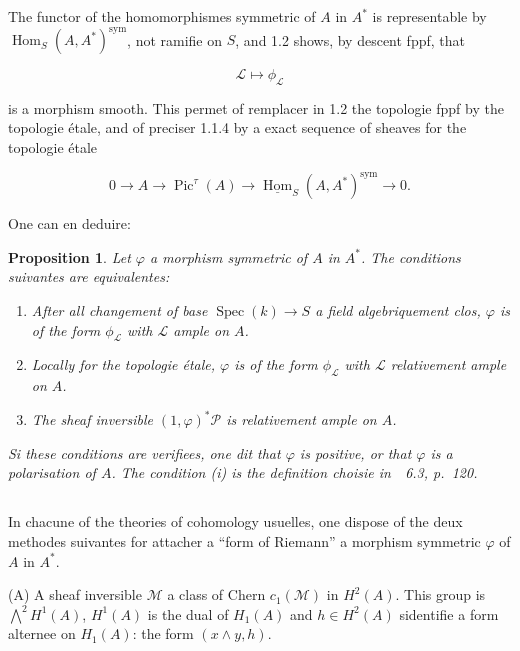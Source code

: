 \documentclass[11pt,a4paper]{article}
\theoremstyle{plain}
\newtheorem{proposition}[theorem]{Proposition}
\theoremstyle{definition}
\DeclareMathOperator{\Hom}{Hom}
\DeclareMathOperator{\Spec}{Spec}
\DeclareMathOperator{\Pic}{Pic}
\begin{document}
The functor of the homomorphismes symmetric of $A$ in $A^*$ is representable by $\Hom_S(A, A^*)^{\text{sym}}$, not ramifie on $S$, and 1.2 shows, by descent fppf,
that

\begin{equation}
\mathscr{L} \longmapsto \phi_{\mathscr{L}}
\end{equation}

is a morphism smooth. This permet of remplacer in 1.2 the topologie fppf
by the topologie étale, and of preciser 1.1.4 by a exact sequence of sheaves for
the topologie étale

\begin{equation}
0 \longrightarrow A \longrightarrow \Pic^\tau(A) \longrightarrow \underline{\Hom}_S(A, A^*)^{\text{sym}} \longrightarrow 0.
\end{equation}

One can en deduire:

\begin{proposition}
Let $\varphi$ a morphism symmetric of $A$ in $A^*$. The
conditions suivantes are equivalentes:
\begin{enumerate}[label=(\roman*)]
\item After all changement of base $\Spec(k) \to S$ a field algebriquement clos,
$\varphi$ is of the form $\phi_{\mathscr{L}}$ with $\mathscr{L}$ ample on $A$.
\item Locally for the topologie étale, $\varphi$ is of the form $\phi_{\mathscr{L}}$ with $\mathscr{L}$ relativement
ample on $A$.
\item The sheaf inversible $(1, \varphi)^*\mathscr{P}$ is relativement ample on $A$.
\end{enumerate}
Si these conditions are verifiees, one dit that $\varphi$ is positive, or that $\varphi$ is a
polarisation of $A$. The condition (i) is the definition choisie in~\cite{GIT}~6.3, p.~120.
\end{proposition}

\subsection{}

In chacune of the theories of cohomology usuelles, one dispose of the deux
methodes suivantes for attacher a ``form of Riemann'' a morphism
symmetric $\varphi$ of $A$ in $A^*$.

(A) A sheaf inversible $\mathscr{M}$ a class of Chern $c_1(\mathscr{M})$ in $H^2(A)$. This
group is $\bigwedge^2 H^1(A)$, $H^1(A)$ is the dual of $H_1(A)$ and $h \in H^2(A)$ sidentifie a
form alternee on $H_1(A)$: the form $(x \wedge y, h)$.
\end{document}
